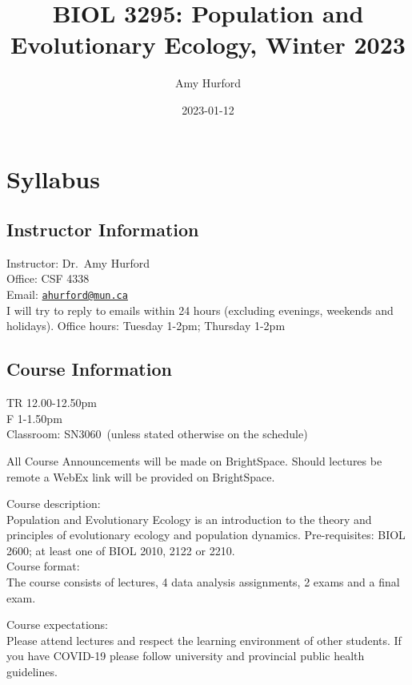 \documentclass[
]{book}
\title{BIOL 3295: Population and Evolutionary Ecology, Winter 2023}
\author{Amy Hurford}
\date{2023-01-12}
\begin{document}
\maketitle

{
\setcounter{tocdepth}{1}
\tableofcontents
}
\hypertarget{syllabus}{%
\chapter{Syllabus}\label{syllabus}}

\hypertarget{instructor-information}{%
\section{Instructor Information}\label{instructor-information}}

Instructor: Dr.~Amy Hurford\\
Office: CSF 4338\\
Email: \href{mailto:ahurford@mun.ca}{\nolinkurl{ahurford@mun.ca}}\\
I will try to reply to emails within 24 hours (excluding evenings, weekends and holidays).
Office hours: Tuesday 1-2pm; Thursday 1-2pm

\hypertarget{course-information}{%
\section{Course Information}\label{course-information}}

TR 12.00-12.50pm\\
F 1-1.50pm\\
Classroom: SN3060~(unless stated otherwise on the schedule)

All Course Announcements will be made on BrightSpace. Should lectures be remote a WebEx link will be provided on BrightSpace.

Course description:\\
Population and Evolutionary Ecology is an introduction to the theory and principles of evolutionary ecology and population dynamics. Pre-requisites: BIOL 2600; at least one of BIOL 2010, 2122 or 2210.\\

Course format:\\
The course consists of lectures, 4 data analysis assignments, 2 exams and a final exam.~

Course expectations:\\
Please attend lectures and respect the learning environment of other students. If you have COVID-19 please follow university and provincial public health guidelines.\\
\end{document}
